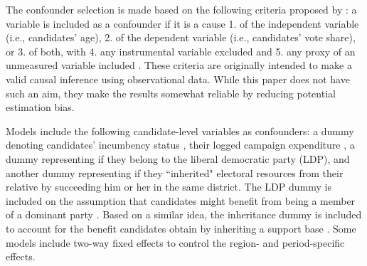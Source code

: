 \documentclass[a4paper, 12pt]{article}\usepackage[dvipdfmx]{graphicx}\usepackage[]{xcolor}
\begin{document}
The confounder selection is made based on the following criteria proposed by \citet{vanderweele2019principles}: a variable is included as a confounder if it is a cause 1. of the independent variable (i.e., candidates' age), 2. of the dependent variable (i.e., candidates' vote share), or 3. of both, with 4. any instrumental variable excluded and 5. any proxy of an unmeasured variable included \citep{vanderweele2019principles}. These criteria are originally intended to make a valid causal inference using observational data. While this paper does not have such an aim, they make the results somewhat reliable by reducing potential estimation bias. 

Models include the following candidate-level variables as confounders: a dummy denoting candidates' incumbency status \footnotemark{}, their logged campaign expenditure \footnotemark{}, a dummy representing if they belong to the liberal democratic party (LDP), and another dummy representing if they ``inherited" electoral resources from their relative by succeeding him or her in the same district. The LDP dummy is included on the assumption that candidates might benefit from being a member of a dominant party \citep{hamzawi2022old}. Based on a similar idea, the inheritance dummy is included to account for the benefit candidates obtain by inheriting a support base \citep{iida2011dynasty} \footnotemark{} \footnotemark{}. Some models include two-way fixed effects to control the region- and period-specific effects. 

\end{document}
